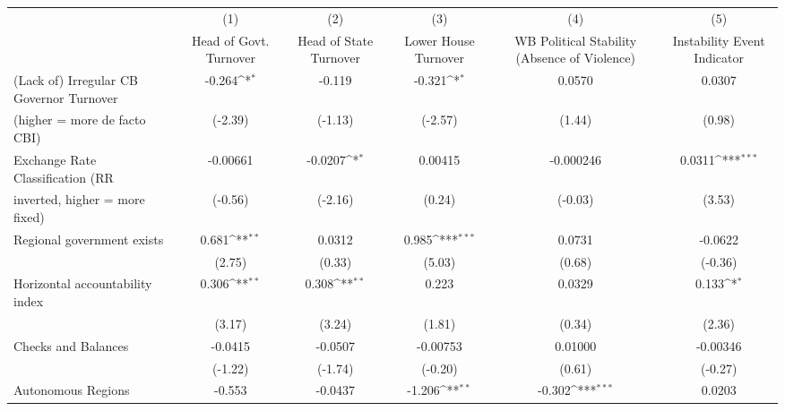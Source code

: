 {
\def\sym#1{\ifmmode^{#1}\else\(^{#1}\)\fi}
\begin{tabular}{l*{5}{c}}
\toprule
                                        &\multicolumn{1}{c}{(1)}&\multicolumn{1}{c}{(2)}&\multicolumn{1}{c}{(3)}&\multicolumn{1}{c}{(4)}&\multicolumn{1}{c}{(5)}\\
                                        &\multicolumn{1}{c}{Head of Govt. Turnover}&\multicolumn{1}{c}{Head of State Turnover}&\multicolumn{1}{c}{Lower House Turnover}&\multicolumn{1}{c}{WB Political Stability (Absence of Violence)}&\multicolumn{1}{c}{Instability Event Indicator}\\
\midrule
(Lack of) Irregular CB Governor Turnover&   -0.264\sym{*}  &   -0.119         &   -0.321\sym{*}  &   0.0570         &   0.0307         \\
(higher = more de facto CBI)            &  (-2.39)         &  (-1.13)         &  (-2.57)         &   (1.44)         &   (0.98)         \\
\addlinespace
Exchange Rate Classification (RR        & -0.00661         &  -0.0207\sym{*}  &  0.00415         &-0.000246         &   0.0311\sym{***}\\
inverted, higher = more fixed)          &  (-0.56)         &  (-2.16)         &   (0.24)         &  (-0.03)         &   (3.53)         \\
\addlinespace
Regional government exists              &    0.681\sym{**} &   0.0312         &    0.985\sym{***}&   0.0731         &  -0.0622         \\
                                        &   (2.75)         &   (0.33)         &   (5.03)         &   (0.68)         &  (-0.36)         \\
\addlinespace
Horizontal accountability index         &    0.306\sym{**} &    0.308\sym{**} &    0.223         &   0.0329         &    0.133\sym{*}  \\
                                        &   (3.17)         &   (3.24)         &   (1.81)         &   (0.34)         &   (2.36)         \\
\addlinespace
Checks and Balances                     &  -0.0415         &  -0.0507         & -0.00753         &  0.01000         & -0.00346         \\
                                        &  (-1.22)         &  (-1.74)         &  (-0.20)         &   (0.61)         &  (-0.27)         \\
\addlinespace
Autonomous Regions                      &   -0.553         &  -0.0437         &   -1.206\sym{**} &   -0.302\sym{***}&   0.0203         \\

\end{tabular}}
